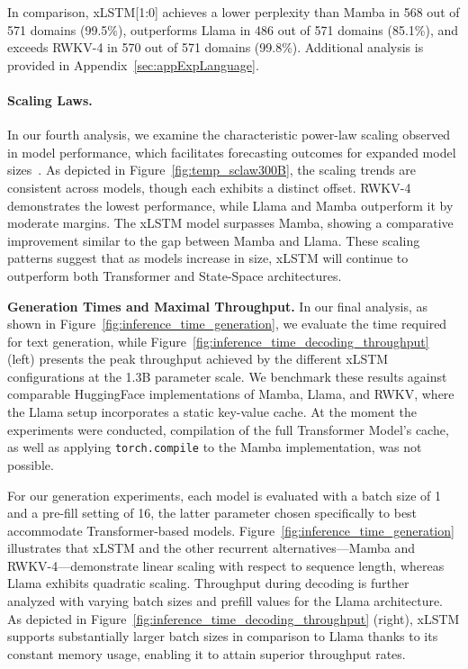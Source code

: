 In comparison, xLSTM[1:0] achieves a lower perplexity than Mamba in 568 out of 571 domains (99.5\%), outperforms Llama in 486 out of 571 domains (85.1\%), and exceeds RWKV-4 in 570 out of 571 domains (99.8\%). Additional analysis is provided in Appendix~\ref{sec:appExpLanguage}.

\paragraph{Scaling Laws.} In our fourth analysis, we examine the characteristic power-law scaling observed in model performance, which facilitates forecasting outcomes for expanded model sizes~\citep{Kaplan:20,Brown:20short}. As depicted in Figure~\ref{fig:temp_sclaw300B}, the scaling trends are consistent across models, though each exhibits a distinct offset. RWKV-4 demonstrates the lowest performance, while Llama and Mamba outperform it by moderate margins. The xLSTM model surpasses Mamba, showing a comparative improvement similar to the gap between Mamba and Llama. These scaling patterns suggest that as models increase in size, xLSTM will continue to outperform both Transformer and State-Space architectures.

\textbf{Generation Times and Maximal Throughput.} In our final analysis, as shown in Figure~\ref{fig:inference_time_generation}, we evaluate the time required for text generation, while Figure~\ref{fig:inference_time_decoding_throughput} (left) presents the peak throughput achieved by the different xLSTM configurations at the 1.3B parameter scale. We benchmark these results against comparable HuggingFace implementations of Mamba, Llama, and RWKV, where the Llama setup incorporates a static key-value cache. At the moment the experiments were conducted, compilation of the full Transformer Model's cache, as well as applying \texttt{torch.compile} to the Mamba implementation, was not possible.

For our generation experiments, each model is evaluated with a batch size of 1 and a pre-fill setting of 16, the latter parameter chosen specifically to best accommodate Transformer-based models. Figure~\ref{fig:inference_time_generation} illustrates that xLSTM and the other recurrent alternatives—Mamba and RWKV-4—demonstrate linear scaling with respect to sequence length, whereas Llama exhibits quadratic scaling. Throughput during decoding is further analyzed with varying batch sizes and prefill values for the Llama architecture. As depicted in Figure~\ref{fig:inference_time_decoding_throughput} (right), xLSTM supports substantially larger batch sizes in comparison to Llama thanks to its constant memory usage, enabling it to attain superior throughput rates.


